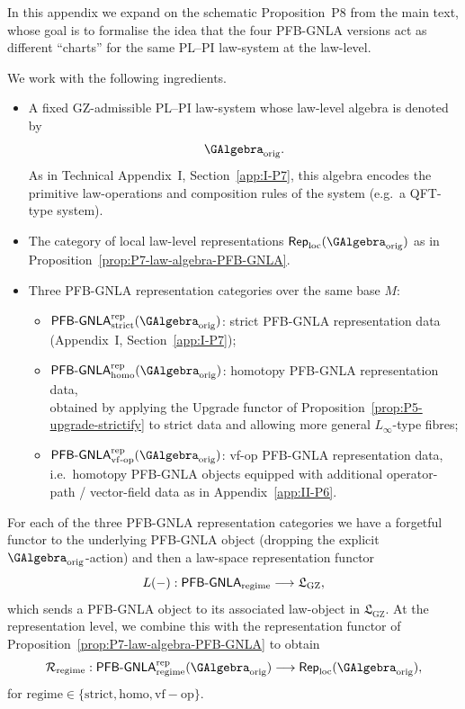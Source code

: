 \documentclass[11pt]{book}
\theoremstyle{plain}
\theoremstyle{definition}
\newcommand{\GZLS}{\ensuremath{\mathfrak{L}_{\mathrm{GZ}}}}       \newcommand{\GZLT}{\ensuremath{M_{!w}}}                           \newcommand{\GZLOC}{\ensuremath{A_M}}                             \newcommand{\GZLCurv}{\ensuremath{\mathcal{F}_{\mathrm{law}}}}
\begin{document}
In this appendix we expand on the schematic Proposition~P8 from the
main text, whose goal is to formalise the idea that the four PFB-GNLA
versions act as different ``charts'' for the same PL--PI law-system at
the law-level.

We work with the following ingredients.

\begin{itemize}
  \item A fixed GZ-admissible PL--PI law-system whose law-level algebra
        is denoted by
        \[
          \GAlgebra_{\mathrm{orig}}.
        \]
        As in Technical Appendix~I, Section~\ref{app:I-P7}, this
        algebra encodes the primitive law-operations and composition
        rules of the system (e.g.\ a QFT-type system).
  \item The category of local law-level representations
        \(\mathsf{Rep}_{\mathrm{loc}}(\GAlgebra_{\mathrm{orig}})\) as
        in \\ Proposition~\ref{prop:P7-law-algebra-PFB-GNLA}.
  \item Three PFB-GNLA representation categories over the same base
        \(M\):
        \begin{itemize}
          \item
            \(\mathsf{PFB\text- GNLA}^{\mathrm{rep}}_{\mathrm{strict}}
              (\GAlgebra_{\mathrm{orig}})\):
            strict PFB-GNLA representation data (Appendix~I,
            Section~\ref{app:I-P7});
          \item
            \(\mathsf{PFB\text- GNLA}^{\mathrm{rep}}_{\mathrm{homo}}
              (\GAlgebra_{\mathrm{orig}})\):
            homotopy PFB-GNLA representation data, \\obtained by
            applying the Upgrade functor of
            Proposition~\ref{prop:P5-upgrade-strictify} to strict
            data and allowing more general \(L_\infty\)-type fibres;
          \item
            \(\mathsf{PFB\text- GNLA}^{\mathrm{rep}}_{\mathrm{vf\text- op}}(\GAlgebra_{\mathrm{orig}})\):
            vf-op PFB-GNLA representation data, i.e.\ homotopy
            PFB-GNLA objects equipped with additional operator-path /
            vector-field data as in Appendix~\ref{app:II-P6}.
        \end{itemize}
\end{itemize}

For each of the three PFB-GNLA representation categories we have a
forgetful functor to the underlying PFB-GNLA object (dropping the
explicit \(\GAlgebra_{\mathrm{orig}}\)-action) and then a law-space
representation functor
\[
  L(-) :
  \mathsf{PFB\text- GNLA}_{\mathrm{regime}}
  \longrightarrow
  \GZLS,
\]
which sends a PFB-GNLA object to its associated law-object in
\(\GZLS\).  At the representation level, we combine this with the
representation functor of Proposition~\ref{prop:P7-law-algebra-PFB-GNLA}
to obtain
\[
  \mathcal{R}_{\mathrm{regime}} :
  \mathsf{PFB\text- GNLA}^{\mathrm{rep}}_{\mathrm{regime}}
    (\GAlgebra_{\mathrm{orig}})
  \longrightarrow
  \mathsf{Rep}_{\mathrm{loc}}(\GAlgebra_{\mathrm{orig}}),
\]
for \(\mathrm{regime}\in\{\mathrm{strict},\mathrm{homo},
\mathrm{vf-op}\}\).
\end{document}
